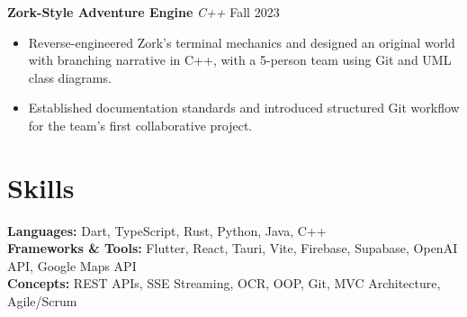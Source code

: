 \documentclass[letterpaper,10.5pt]{article}
\begin{document}
\vspace{4pt}

\textbf{Zork-Style Adventure Engine} \hfill
\textit{C++} \hfill Fall 2023 \\
\begin{itemize}[leftmargin=1.5em, itemsep=1pt, topsep=3pt]
  \item Reverse-engineered Zork's terminal mechanics and designed an
        original world with branching narrative in C++, with a
        5-person team using Git and UML class diagrams.
  \item Established documentation standards and introduced structured
        Git workflow for the team's first collaborative project.
\end{itemize}

\section{Skills}

\textbf{Languages:} Dart, TypeScript, Rust, Python, Java, C++ \\
\textbf{Frameworks \& Tools:} Flutter, React, Tauri, Vite, Firebase,
Supabase, OpenAI API, Google Maps API \\
\textbf{Concepts:} REST APIs, SSE Streaming, OCR, OOP, Git,
MVC Architecture, Agile/Scrum
\end{document}
